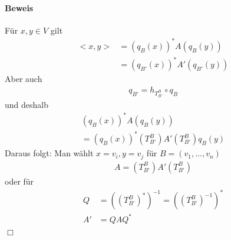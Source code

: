 \paragraph{Beweis}
Für $x, y \in V$ gilt
\begin{align}
<x, y> &= (q_B(x))^{*} A (q_B(y)) \\
&= (q_{B'}(x))^{*} A' (q_{B'}(y))
\end{align}
Aber auch
\begin{align}
q_{B'} = h_{T_{B'}^{B}} \circ q_{B}
\end{align}
und deshalb
\begin{align}
(q_B(x))^{*} A (q_B(y)) \\
= (q_B(x))^{*} (T_{B'}^{B}) A' (T_{B'}^{B}) q_B(y)
\end{align}
Daraus folgt: Man wählt $x=v_i, y = v_j$ für $B = (v_1, ..., v_n)$
\begin{align}
A = (T_{B'}^{B}) A' (T_{B'}^{B})
\end{align}
oder für 
\begin{align}
Q &= ((T_{B'}^{B})^{*})^{-1} = ((T_{B'}^{B})^{-1})^{*} \\
A' &= QAQ^{*}
\end{align}
\hspace*{1cm} \hfill $\Box$

